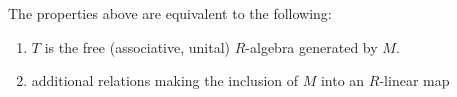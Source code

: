 \begin{remark}
    \label{mk:TensorAlgebra}

    The properties above are equivalent to the following:

    \begin{enumerate}
        \item $T$ is the free (associative, unital) $R$-algebra generated by $M$.
        \item additional relations making the inclusion of $M$ into an $R$-linear map
    \end{enumerate}
    
\end{remark}